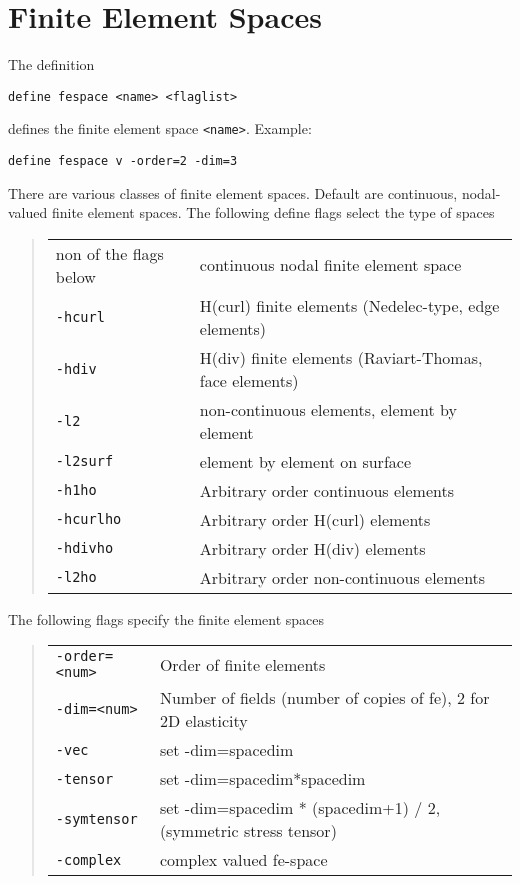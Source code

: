 \documentclass[12pt]{book}
\begin{document}
\section{Finite Element Spaces}
The definition
\begin{verbatim}
define fespace <name> <flaglist>
\end{verbatim}
defines the finite element space {\tt <name>}.
Example:
\begin{verbatim}
define fespace v -order=2 -dim=3
\end{verbatim}
There are various classes of finite element spaces. Default are continuous,
nodal-valued finite element spaces. The following define flags select the type
of spaces 
\begin{quote}
\begin{tabular}{|l|l|}
\hline
non of the flags below & continuous nodal finite element space \\
{\tt -hcurl } & H(curl) finite elements (Nedelec-type, edge elements) \\
{\tt -hdiv  } & H(div) finite elements (Raviart-Thomas, face elements) \\
{\tt -l2    }  & non-continuous elements, element by element \\
{\tt -l2surf } & element by element on surface \\
{\tt -h1ho } & Arbitrary order continuous elements \\
{\tt -hcurlho } & Arbitrary order H(curl) elements \\
{\tt -hdivho } & Arbitrary order H(div) elements \\
{\tt -l2ho } & Arbitrary order non-continuous elements \\
\hline
\end{tabular}
\end{quote}

The following flags specify the finite element spaces
\begin{quote}
\begin{tabular}{|l|l|}
\hline
{\tt -order=<num>} & Order of finite elements \\
{\tt -dim=<num>}   & Number of fields (number of copies of fe), 2 for 2D elasticity \\
{\tt -vec}         & set -dim=spacedim \\
{\tt -tensor}      & set -dim=spacedim*spacedim \\
{\tt -symtensor}   & set -dim=spacedim * (spacedim+1) / 2,  (symmetric stress tensor) \\
{\tt -complex}     & complex valued fe-space \\
\hline
\end{tabular}
\end{quote}
\end{document}
